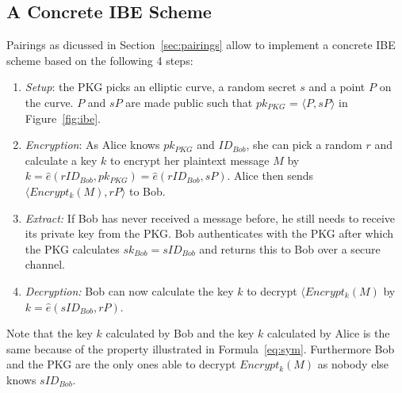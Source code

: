 \documentclass[journal]{IEEEtran}
\begin{document}
\subsection{A Concrete IBE Scheme}
Pairings as dicussed in Section~\ref{sec:pairings} allow to implement a
concrete IBE scheme based on the following 4 steps:

\begin{enumerate}
 \item \textit{Setup}: the PKG picks an elliptic curve, a  random secret $s$ and
a point $P$ on the curve. $P$ and $sP$ are made public such that $pk_{PKG}$ =
$\langle P, sP\rangle$ in Figure~\ref{fig:ibe}.
 \item \textit{Encryption}: As Alice knows $pk_{PKG}$ and $ID_{Bob}$, she can
pick a random $r$ and calculate a key $k$ to encrypt her plaintext message $M$
by $k = \hat{e} \left( r ID_{Bob}, pk_{PKG}\right)= \hat{e} \left( r ID_{Bob},
sP \right)$. Alice then sends $\langle Encrypt_{k}\left( M \right), rP \rangle$
to Bob.
 \item \textit{Extract:} If Bob has never received a message before, he still
needs to receive its private key from the PKG. Bob authenticates with the PKG
after which the PKG calculates $sk_{Bob} = s ID_{Bob}$ and returns this to Bob
over a secure channel.
 \item \textit{Decryption:} Bob can now calculate the key $k$ to decrypt
$\langle Encrypt_{k}\left( M \right)$ by $k = \hat{e} \left( s ID_{Bob}, rP
\right)$.
\end{enumerate}
Note that the key $k$ calculated by Bob and the key $k$ calculated by Alice is
the same because of the property illustrated in Formula~\ref{eq:sym}.
Furthermore Bob and the PKG are the only ones able to decrypt $Encrypt_{k}\left(
M \right)$ as nobody else knows $s ID_{Bob}$.
\end{document}
